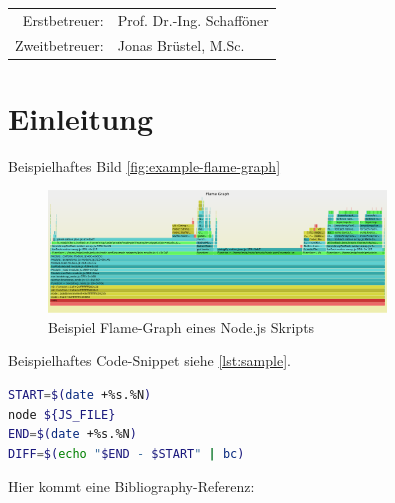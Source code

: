 \documentclass[
12pt,
english,
ngerman,
headsepline,
twoside,
openright,
numbers=noenddot,version=first
]{scrreprt}
\providecommand{\tabularnewline}{\\}
\let\myTOC\tableofcontents
\renewcommand\tableofcontents{
    \begin{spacing}{1.1}
    \myTOC
    \end{spacing}
    \clearpage
    \pagenumbering{arabic}
}
\begin{document}
\vspace{1cm}

\noindent \begin{center}
\medskip{}
\begin{tabular}{rl}
Erstbetreuer: & Prof. Dr.-Ing. Schafföner\tabularnewline
Zweitbetreuer: & Jonas Brüstel, M.Sc.\tabularnewline
\end{tabular}
\par\end{center}

\noindent \begin{center}
{\huge }
\par\end{center}{\huge \par}

\newpage{}

%
\tableofcontents{}

\pagestyle{scrheadings}   

\chapter{Einleitung}
\setcounter{page}{1}
\label{chap:introduction}

Beispielhaftes Bild \autoref{fig:example-flame-graph}

\begin{figure}[h]
	\centering
	\includegraphics[width=0.8\textwidth]{pics/example-flame-graph.eps}
	\caption{Beispiel Flame-Graph eines Node.js Skripts}
	\label{fig:example-flame-graph}
\end{figure}

Beispielhaftes Code-Snippet siehe \autoref{lst:sample}.

\begin{lstlisting}[language=bash,caption={Aufnahme der \glqq real\grqq-Zeit},label={lst:sample}]
START=$(date +%s.%N)
node ${JS_FILE}
END=$(date +%s.%N)
DIFF=$(echo "$END - $START" | bc)
\end{lstlisting}

Hier kommt eine Bibliography-Referenz: \cite{booch2007object}
\end{document}
